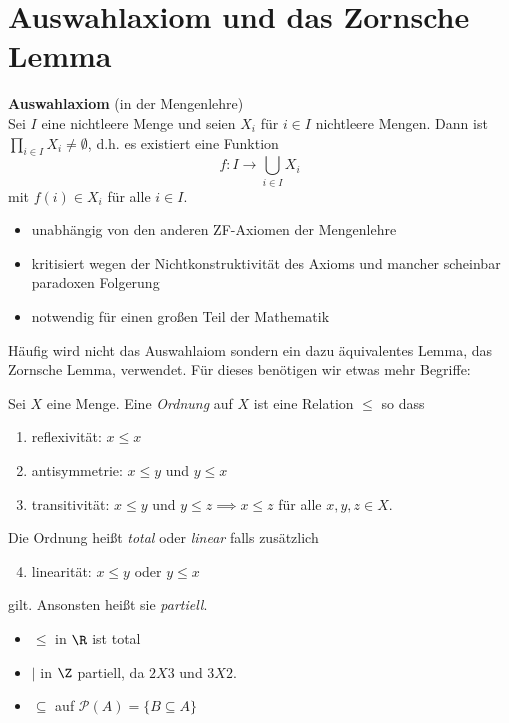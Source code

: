 \graphicspath{{Images/}}

\chapter{Auswahlaxiom und das Zornsche Lemma}

\textbf{Auswahlaxiom} (in der Mengenlehre)\\
	Sei $I$ eine nichtleere Menge und seien $X_{i}$ für $i \in I$ nichtleere Mengen.
	Dann ist $\prod_{i \in I} X_{i} \neq \emptyset$, d.h. es existiert eine Funktion
	\[
	f: I \to \bigcup_{i \in I} X_{i}
	\] 
	mit $f(i) \in X_{i}$ für alle $i \in I$.

\begin{remark}
	\begin{itemize}
		\item unabhängig von den anderen ZF-Axiomen der Mengenlehre
		\item kritisiert wegen der Nichtkonstruktivität des Axioms und mancher scheinbar paradoxen Folgerung
		\item notwendig für einen großen Teil der Mathematik
	\end{itemize}
\end{remark}

Häufig wird nicht das Auswahlaiom sondern ein dazu äquivalentes Lemma, das Zornsche Lemma, verwendet. Für dieses benötigen wir etwas mehr Begriffe:

\begin{definition}
	Sei $X$ eine Menge. Eine \emph{Ordnung} auf $X$ ist eine Relation $\leq$ so dass
	\begin{enumerate}[1)]
		\item reflexivität: $x \leq x$
		\item antisymmetrie: $x \leq y$ und $y \leq x$ 
		\item transitivität: $x \leq y$ und $y \leq z \implies x \leq z$ für alle $x,y,z \in X$.
	\end{enumerate}
	Die Ordnung heißt \emph{total} oder \emph{linear} falls zusätzlich
	\begin{enumerate}[1)]
		\setcounter{enumi}{3}
		\item linearität: $x \leq y$ oder $y \leq x$
	\end{enumerate}
	gilt. Ansonsten heißt sie \emph{partiell}.
\end{definition}

\begin{eg}
	\begin{itemize}
		\item $\leq$ in $\R$ ist total
		\item $\mid$ in $\Z$ partiell, da $2 X 3$ und $3 X 2$.
		\item $\subseteq$ auf $\mathcal{P}(A) = \{B \subseteq A\} $
	\end{itemize}
\end{eg}

